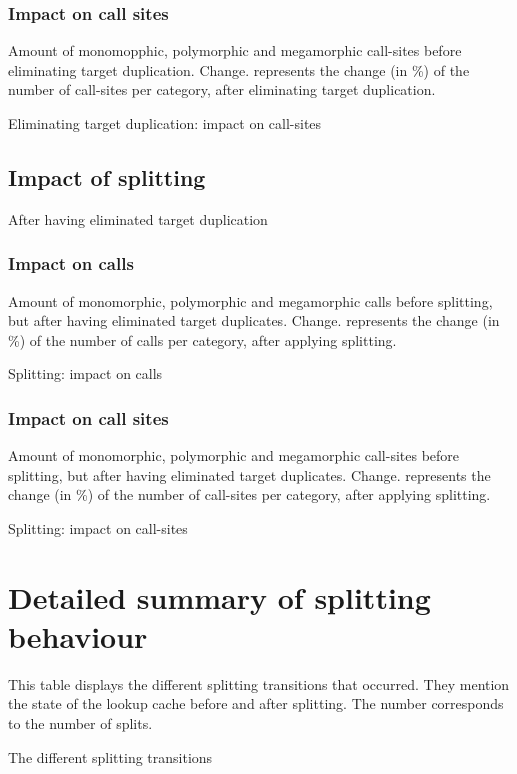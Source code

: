 \documentclass[preprint]{acmart}
\begin{document}
\subsubsection{\textbf{Impact on call sites}}

Amount of monomopphic, polymorphic and megamorphic call-sites before eliminating target duplication.
Change. represents the change (in \%) of the number of call-sites per category, after eliminating target duplication.

\begin{table}[h!]
	\centering
	\BeforeAfterTPSites
	\caption{Eliminating target duplication: impact on call-sites}
\end{table}

\subsection{Impact of splitting}
After having eliminated target duplication

\subsubsection{\textbf{Impact on calls}}

Amount of monomorphic, polymorphic and megamorphic calls before splitting, but after having eliminated target duplicates.
Change. represents the change (in \%) of the number of calls per category, after applying splitting.

\begin{table}[h!]
	\centering	
	\BeforeAfterSplitCalls
	\caption{Splitting: impact on calls}
\end{table}

\subsubsection{\textbf{Impact on call sites}}

Amount of monomorphic, polymorphic and megamorphic call-sites before splitting, but after having eliminated target duplicates.
Change. represents the change (in \%) of the number of call-sites per category, after applying splitting.

\begin{table}[h!]
	\centering
	\BeforeAfterSplitSites
	\caption{Splitting: impact on call-sites}
\end{table}

\section{Detailed summary of splitting behaviour}

This table displays the different splitting transitions that occurred. They mention the state of the lookup cache before and after splitting. The number corresponds to the number of splits.

\begin{table}[h!]
	\centering
	\SplittingTransitions
	\caption{The different splitting transitions}
\end{table}
\end{document}
